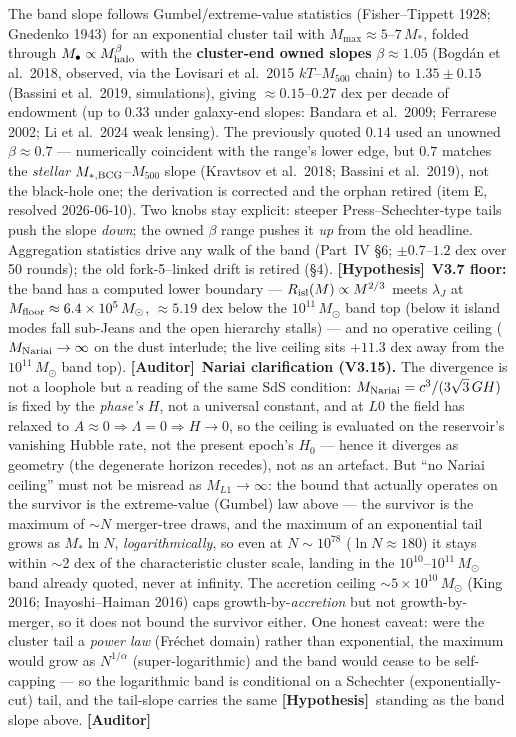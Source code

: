 \documentclass[11pt]{article}
\newcommand{\Auditor}{\textbf{\textcolor{teal!55!black}{[Auditor]}}}
\newcommand{\hyp}{\textcolor{orange!80!black}{\textbf{[Hypothesis]}}}
\newcommand{\msun}{M_\odot}
\begin{document}
The band slope follows Gumbel/extreme-value statistics (Fisher--Tippett 1928; Gnedenko 1943) for an exponential cluster tail with $M_{\max}\approx5$--$7\,M_*$, folded through $M_\bullet\propto M_{\rm halo}^{\beta}$ with the \textbf{cluster-end owned slopes} $\beta\approx1.05$ (Bogd\'an et al.\ 2018, observed, via the Lovisari et al.\ 2015 $kT$--$M_{500}$ chain) to $1.35\pm0.15$ (Bassini et al.\ 2019, simulations), giving $\approx0.15$--$0.27$ dex per decade of endowment (up to $0.33$ under galaxy-end slopes: Bandara et al.\ 2009; Ferrarese 2002; Li et al.\ 2024 weak lensing). The previously quoted $0.14$ used an unowned $\beta\approx0.7$ --- numerically coincident with the range's lower edge, but $0.7$ matches the \emph{stellar} $M_{*,\rm BCG}$--$M_{500}$ slope (Kravtsov et al.\ 2018; Bassini et al.\ 2019), not the black-hole one; the derivation is corrected and the orphan retired (item E, resolved 2026-06-10). Two knobs stay explicit: steeper Press--Schechter-type tails push the slope \emph{down}; the owned $\beta$ range pushes it \emph{up} from the old headline. Aggregation statistics drive any walk of the band (Part~IV \S6; $\pm0.7$--$1.2$ dex over 50 rounds); the old fork-5--linked drift is retired (\S4). \hyp\ \textbf{V3.7 floor:} the band has a computed lower boundary --- $R_{\rm isl}(M)\propto M^{2/3}$ meets $\lambda_J$ at $M_{\rm floor}\approx6.4\times10^{5}\,\msun$, $\approx5.19$ dex below the $10^{11}\,\msun$ band top (below it island modes fall sub-Jeans and the open hierarchy stalls) --- and no operative ceiling ($M_{\rm Nariai}\to\infty$ on the dust interlude; the live ceiling sits $+11.3$ dex away from the $10^{11}\,M_\odot$ band top). \Auditor\ \textbf{Nariai clarification (V3.15).} The divergence is not a loophole but a reading of the same SdS condition: $M_{\rm Nariai}=c^3/(3\sqrt3\,GH)$ is fixed by the \emph{phase's} $H$, not a universal constant, and at $L0$ the field has relaxed to $A\approx0\Rightarrow\Lambda=0\Rightarrow H\to0$, so the ceiling is evaluated on the reservoir's vanishing Hubble rate, not the present epoch's $H_0$ --- hence it diverges as geometry (the degenerate horizon recedes), not as an artefact. But ``no Nariai ceiling'' must not be misread as $M_{L1}\to\infty$: the bound that actually operates on the survivor is the extreme-value (Gumbel) law above --- the survivor is the maximum of $\sim\!N$ merger-tree draws, and the maximum of an exponential tail grows as $M_*\ln N$, \emph{logarithmically}, so even at $N\sim10^{78}$ ($\ln N\approx180$) it stays within $\sim$2 dex of the characteristic cluster scale, landing in the $10^{10}$--$10^{11}\,\msun$ band already quoted, never at infinity. The accretion ceiling $\sim5\times10^{10}\,\msun$ (King 2016; Inayoshi--Haiman 2016) caps growth-by-\emph{accretion} but not growth-by-merger, so it does not bound the survivor either. One honest caveat: were the cluster tail a \emph{power law} (Fr\'echet domain) rather than exponential, the maximum would grow as $N^{1/\alpha}$ (super-logarithmic) and the band would cease to be self-capping --- so the logarithmic band is conditional on a Schechter (exponentially-cut) tail, and the tail-slope carries the same \hyp\ standing as the band slope above. \Auditor
\end{document}
